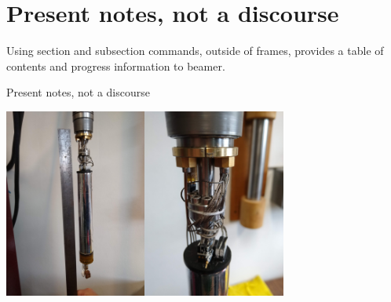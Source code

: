 \documentclass[ignorenonframetext,12pt]{beamer}
\begin{document}
\section{Present notes, not a discourse}
Using section and subsection commands, outside of frames, provides a table of contents and progress information to beamer.
\begin{frame}{Present notes, not a discourse}
\begin{center}
\hspace{-2mm}\includegraphics[width=0.35\textwidth]{IMG_20190523_105037648}\hspace{2mm}\includegraphics[width=0.35\textwidth]{IMG_20190523_105054061}

\end{center}
\end{frame}
\end{document}
